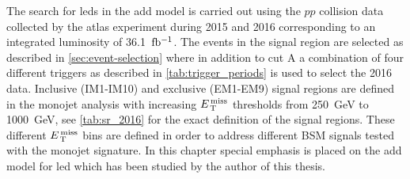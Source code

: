 The search for \glspl{led} in the \gls{add} model is carried out using the $pp$
collision data collected by the \gls{atlas} experiment during 2015 and 2016
corresponding to an integrated luminosity of 36.1~$\mbox{fb$^{-1}$}$. The events in the
signal region are selected as described in \cref{sec:event-selection} where in
addition to cut A a combination of four different triggers as described in
\cref{tab:trigger_periods} is used to select the 2016 data. Inclusive (IM1-IM10)
and exclusive (EM1-EM9) signal regions are defined in the monojet analysis with
increasing $E_\mathrm{\, T}^\mathrm{\, miss}$ thresholds from 250~GeV to 1000~GeV, see \cref{tab:sr_2016}
for the exact definition of the signal regions. These different $E_\mathrm{\, T}^\mathrm{\, miss}$ bins are
defined in order to address different BSM signals tested with the monojet
signature. In this chapter special emphasis is placed on the \gls{add} model for
\gls{led} which has been studied by the author of this thesis.
\begin{table}[!th]
  \centering
  \caption{Definition of the signal region.}
  \label{tab:sr_2016}
\end{table}
